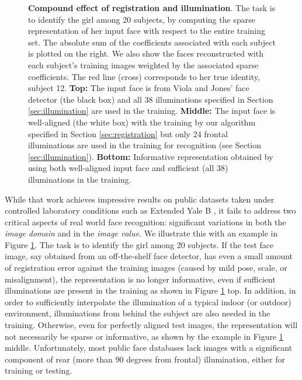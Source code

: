 \begin{figure}
\begin{tabular}{cc}
\end{tabular}
\caption{{\bf Compound effect of registration and illumination}. The task is to identify the girl among 20 subjects, by computing the sparse representation of her input face with respect to the entire training set. The absolute sum of the coefficients associated with each subject is plotted on the right. We also show the faces reconstructed with each subject's training images weighted by the associated sparse coefficients. The red line (cross) corresponds to her true identity, subject 12. {\bf Top:} The input face is from Viola and Jones' face detector (the black box) and all 38 illuminations specified in Section \ref{sec:illumination} are used in the training.  {\bf Middle:} The input face is well-aligned (the white box) with the training by our algorithm specified in Section \ref{sec:registration} but only 24 frontal illuminations are used in the training for recognition (see Section \ref{sec:illumination}). {\bf Bottom:} Informative representation obtained by using both well-aligned input face and sufficient (all 38) illuminations in the training. \vspace{0mm}} 
\label{fig:promo}
\end{figure}

While that work achieves impressive results on public datasets taken under controlled laboratory conditions such as Extended Yale B \cite{Georghiades2001-PAMI}, it fails to address two critical aspects of real world face recognition: significant variations in both the {\em image domain} and in the {\em image value}. We illustrate this with an example in  Figure \ref{fig:promo}. The task is to identify the girl among 20 subjects. If the test face image, say obtained from an off-the-shelf face detector, has even a small amount of registration error against the training images (caused by mild pose, scale, or misalignment), the representation is no longer informative, even if sufficient illuminations are present in the training as shown in Figure \ref{fig:promo} top. In addition, in order to sufficiently interpolate the illumination of a typical indoor (or outdoor) environment, illuminations from behind the subject are also needed in the training. Otherwise, even for perfectly aligned test images, the representation will not necessarily be sparse or informative, as shown by the example in Figure \ref{fig:promo} middle. Unfortunately, most public face databases lack images with a significant component of rear (more than 90 degrees from frontal) illumination, either for training or testing.\vspace{0mm}

